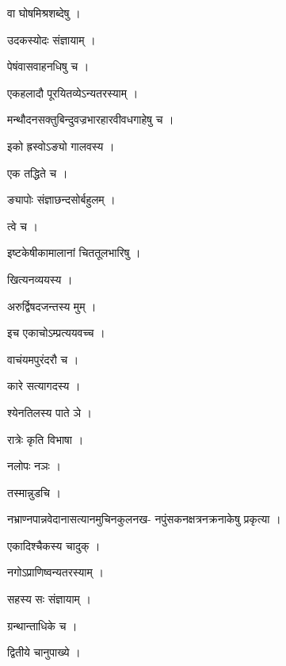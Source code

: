 \documentclass[10pt, openany]{book}
\begin{document}
\noindent वा घोषमिश्रशब्देषु ।

\noindent उदकस्योदः संज्ञायाम् ।

\noindent पेषंवासवाहनधिषु च ।

\noindent एकहलादौ पूरयितव्येऽन्यतरस्याम् ।

\noindent मन्थौदनसक्तुबिन्दुवज्रभारहारवीवधगाहेषु च ।

\noindent इको ह्रस्वोऽङ्यो गालवस्य ।

\noindent एक तद्धिते च ।

\noindent ङ्यापोः संज्ञाछन्दसोर्बहुलम् ।

\noindent त्वे च ।

\noindent इष्टकेषीकामालानां चिततूलभारिषु ।

\noindent खित्यनव्ययस्य ।

\noindent अरुर्द्विषदजन्तस्य मुम् ।

\noindent इच एकाचोऽम्प्रत्ययवच्च ।

\noindent वाचंयमपुरंदरौ च ।

\noindent कारे सत्यागदस्य ।

\noindent श्येनतिलस्य पाते ञे ।

\noindent रात्रेः कृति विभाषा ।

\noindent नलोपः नञः ।

\noindent तस्मान्नुडचि ।

\noindent नभ्राण्नपान्नवेदानासत्यानमुचिनकुलनख- नपुंसकनक्षत्रनक्रनाकेषु प्रकृत्या ।

\noindent एकादिश्चैकस्य चादुक् ।

\noindent नगोऽप्राणिष्वन्यतरस्याम् ।

\noindent सहस्य सः संज्ञायाम् ।

\noindent ग्रन्थान्ताधिके च ।

\noindent द्वितीये चानुपाख्ये ।
\end{document}

